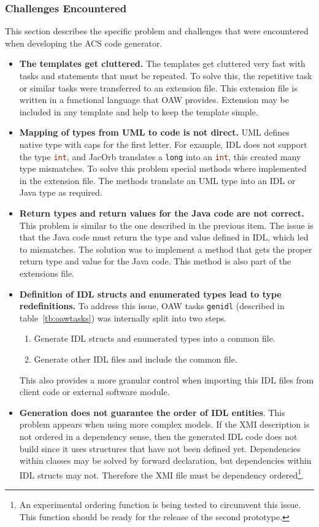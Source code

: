 \subsubsection{Challenges Encountered}
This section describes the specific problem and challenges that were encountered
when developing the ACS code generator.
\begin{itemize}
  \item{\textbf{The templates get cluttered.}}
  The templates get cluttered very fast with tasks
  and
  statements that must be repeated.
  To solve this, the repetitive task or
  similar tasks were transferred to an
  extension file.
  This extension file is written in a
  functional language that OAW provides.
  Extension may be included in any template
  and help to keep the template simple.
  \item{\textbf{Mapping of types from UML to code is not direct.}}
  UML defines native type with caps for the first letter.
  For example,
  IDL does not support the type \lstinline[language=Java]!int!,
  and JacOrb translates a
  \lstinline[language=IDL]!long! into an \lstinline[language=Java]!int!,
  this created many type
  mismatches. To solve this problem
  special methods where implemented in the extension file.
  The methods translate an UML type into an IDL or Java type
  as required.
  \item{\textbf{Return types and return values for the Java code are not correct.}}
  This problem is similar to the one described in the previous item.
  The issue is that the Java code must return the type and value defined in IDL,
  which led to mismatches. The solution was to implement a method that gets the proper
  return type and value for the Java code. This method is also part of the
  extensions file.
  \item{\textbf{Definition of IDL structs and enumerated types lead to type redefinitions.}}
  To address this issue, OAW tasks \lstinline[language=sh]!genidl! (described in table~\ref{tb:oawtasks})
  was internally split into two steps.
  \begin{enumerate}
    \item Generate IDL structs and enumerated types into a common file.
    \item Generate other IDL files and include the common file.
  \end{enumerate}
  This also provides a more granular control
  when importing this IDL files from client code
  or external software module.
  \item{\textbf{Generation does not guarantee the order of IDL entities}}.
  This problem appears when using more complex models. If the XMI description
  is not ordered in a dependency sense, then the generated IDL code
  does not build since it uses structures that have not been defined yet.
  Dependencies within classes may be solved by forward declaration, but
  dependencies within IDL structs may not.
  Therefore the XMI file must be dependency ordered\footnote{%
  An experimental ordering function is being tested to circumvent this issue.
  This function should be ready for the release of the second prototype.}.
\end{itemize}


